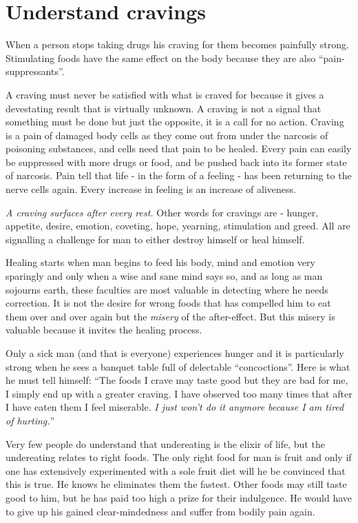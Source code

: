 \documentclass[landscape,twocolumn,letterpaper]{article}
\begin{document}
\section{Understand cravings}

When a person stops taking drugs his craving for them becomes
painfully strong. Stimulating foods have the same effect on the body
because they are also ``pain-suppressants''.

A craving must never be satisfied with what is craved for because it
gives a devestating result that is virtually unknown. A craving is not
a signal that something must be done but just the opposite, it is a
call for no action. Craving is a pain of damaged body cells as they
come out from under the narcosis of poisoning substances, and cells
need that pain to be healed. Every pain can easily be suppressed with
more drugs or food, and be pushed back into its former state of
narcosis. Pain tell that life - in the form of a feeling - has been
returning to the nerve cells again. Every increase in feeling is an
increase of aliveness.

\emph{A craving surfaces after every rest.} Other words for cravings
are - hunger, appetite, desire, emotion, coveting, hope, yearning,
stimulation and greed. All are signalling a challenge for man to
either destroy himself or heal himself.

Healing starts when man begins to feed his body, mind and emotion very
sparingly and only when a wise and sane mind says so, and as long as
man sojourns earth, these faculties are most valuable in detecting
where he needs correction. It is not the desire for wrong foods that
has compelled him to eat them over and over again but the
\emph{misery} of the after-effect. But this misery is valuable because
it invites the healing process.

Only a sick man (and that is everyone) experiences hunger and it is
particularly strong when he sees a banquet table full of delectable
``concoctions''. Here is what he must tell himself: ``The foods I
crave may taste good but they are bad for me, I simply end up with a
greater craving. I have observed too many times that after I have
eaten them I feel miserable. \emph{I just won't do it anymore because
I am tired of hurting.}''

Very few people do understand that undereating is the elixir of life,
but the undereating relates to right foods. The only right food for
man is fruit and only if one has extensively experimented with a sole
fruit diet will he be convinced that this is true. He knows he
eliminates them the fastest. Other foods may still taste good to him,
but he has paid too high a prize for their indulgence. He would have
to give up his gained clear-mindedness and suffer from bodily pain
again.
\end{document}

